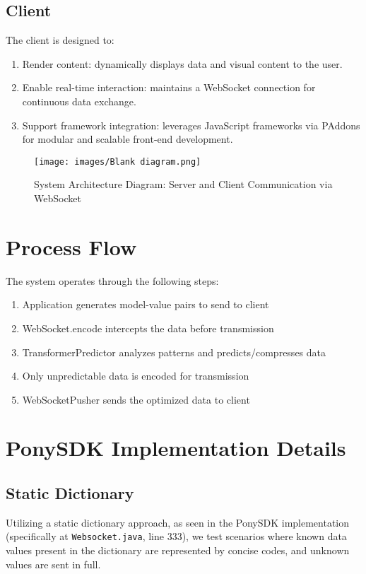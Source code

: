 \documentclass[a4paper, 11pt, twoside, openright]{report}
\begin{document}
\subsection{Client}
The client is designed to:
\begin{enumerate}[label=\arabic*.]
    \item Render content: dynamically displays data and visual content to the user.
    \item Enable real-time interaction: maintains a WebSocket connection for continuous data exchange.
    \item Support framework integration: leverages JavaScript frameworks via PAddons for modular and scalable front-end development.
\end{enumerate}

\begin{figure}[h!]
    \centering
    \texttt{[image: images/Blank diagram.png]}
    \caption{System Architecture Diagram: Server and Client Communication via WebSocket}
    \label{fig:system_architecture}
\end{figure}

\section{Process Flow}
The system operates through the following steps:

\begin{enumerate}[label=\arabic*.]
    \item Application generates model-value pairs to send to client
    \item WebSocket.encode intercepts the data before transmission
    \item TransformerPredictor analyzes patterns and predicts/compresses data
    \item Only unpredictable data is encoded for transmission
    \item WebSocketPusher sends the optimized data to client
\end{enumerate}

\section{PonySDK Implementation Details}

\subsection{Static Dictionary}
Utilizing a static dictionary approach, as seen in the PonySDK implementation (specifically at \texttt{Websocket.java}, line 333), we test scenarios where known data values present in the dictionary are represented by concise codes, and unknown values are sent in full.
\end{document}
